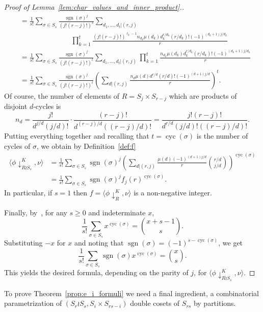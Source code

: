 \documentclass[ALCO,published]{cedram}
\DeclareMathOperator\cyc{cyc}
\DeclareMathOperator\sgn{sgn}
\begin{document}
\begin{proof}[Proof of  Lemma~\ref{lem:char_values_and_inner_product}.]
\begin{align*}
        &= \frac{1}{s!} \sum_{\sigma\in S_s} 
        \frac{\sgn(\sigma)^j}{(j!(r-j)!)^s} 
        \sum_{d_1,\ldots, d_t | (r,j)}\\
        &\, \qquad\qquad\qquad\quad
        \prod_{k=1}^{t} 
        \frac{(j!(r-j)!)^{\ell_k-1} n_{d_k} \mu(d_k) d_k^{r/d_k} (r/d_k)! (-1)^{(d_k+1)j/d_k}}{r} \\
        &= \frac{1}{s!} \sum_{\sigma\in S_s} 
        \frac{\sgn(\sigma)^j}{(j!(r-j)!)^t} 
        \sum_{d_1,\ldots, d_t | (r,j)}
        \prod_{k=1}^{t} 
        \frac{n_{d_k} \mu(d_k) d_k^{r/d_k} (r/d_k)! (-1)^{(d_k+1)j/d_k}}{r} \\
        &= \frac{1}{s!} \sum_{\sigma \in S_s} 
        \frac{\sgn(\sigma)^j}{(j!(r-j)!)^t} 
        \left( \sum_{d|(r,j)} \frac{n_d \mu(d)d^{r/d}(r/d)!  (-1)^{(d+1)j/d}}{r} \right)^t.
    \end{align*}
    Of course, the number of elements of $R = S_j \times S_{r-j}$ which are products of disjoint $d$-cycles is
    \[
        n_d
        = \frac{j!}{d^{j/d} (j/d)!} \cdot \frac{(r-j)!}{d^{(r-j)/d} ((r-j)/d)!}
        = \frac{j!(r-j)!}{d^{r/d}(j/d)!((r-j)/d)!}.
    \]
    Putting everything together
    and recalling that $t = \cyc(\sigma)$ is the number of cycles of $\sigma$,
    we obtain by Definition~\ref{def:f}
    \begin{align*} 
        \langle \phi\downarrow_{R \wr S_{s}}^K,\nu \rangle
        &= \frac{1}{s!} \sum_{\sigma \in S_s} \sgn(\sigma)^j 
        \left( \sum_{d|(r,j)} \frac{\mu(d)(-1)^{(d+1)j/d}}{r} \binom{r/d}{j/d} \right)^{\cyc(\sigma)} \\
        &= \frac{1}{s!} \sum_{\sigma \in S_s} \sgn(\sigma)^j f_j(r)^{\cyc(\sigma)}.
    \end{align*}
    In particular, if $s=1$ then $f = \langle \phi\downarrow_R^K,\nu \rangle$
    is a non-negative integer.
		
    Finally, by~\cite[Proposition 1.3.4]{EC1}, for any $s \ge 0$ and indeterminate $x$, 
    \[
        \frac{1}{s!} \sum_{\sigma \in S_s} x^{\cyc(\sigma)}
        = \binom{x+s-1}{s}.
    \]
    Substituting $-x$ for $x$ and noting that 
    $\sgn(\sigma) = (-1)^{s-\cyc(\sigma)}$, we get
    \[
        \frac{1}{s!} \sum_{\sigma \in S_s} \sgn(\sigma) x^{\cyc(\sigma)} 
        = \binom{x}{s}.
    \]
    This yields the desired formula,
    depending on the parity of $j$,
    for $\langle \phi\downarrow_{R \wr S_{s}}^K,\nu \rangle$.
\end{proof}

To prove Theorem~\ref{prop:e_i_formuli} we need a final ingredient, a combinatorial parametrization of 
$(S_r\wr S_s,S_i\times S_{rs-i})$ double cosets of $S_{rs}$  by partitions.
\end{document}

